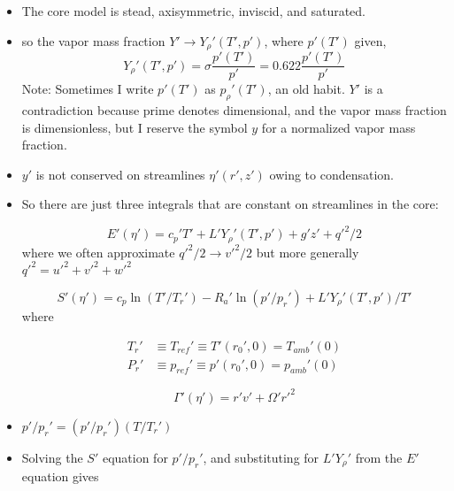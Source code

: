 \documentclass{article}
\begin{document}
\begin{itemize}
\item The core model is stead, axisymmetric, inviscid, and saturated.

\item so the vapor mass fraction $Y' \rightarrow Y_\rho'(T',p')$, where $p'(T')$ given,
\begin{equation}
	Y_\rho'(T',p') = \sigma \frac{p'(T')}{p'} = 0.622 \frac{p'(T')}{p'}
\end{equation}
Note: Sometimes I write $p'(T')$ as $p_\rho'(T')$, an old habit. $Y'$ is a contradiction because prime denotes dimensional, and the vapor mass fraction is dimensionless, but I reserve the symbol $y$ for a normalized vapor mass fraction.

\item $y'$ is not conserved on streamlines $\eta'(r',z')$ owing to condensation.

\item So there are just three integrals that are constant on streamlines in the core:

\begin{equation}
E'(\eta') = c_p' T' + L' Y_\rho'(T',p') + g'z' + q'^2/2
\end{equation}
where we often approximate $q'^2/2 \rightarrow v'^2/2$ but more generally $q'^2 = u'^2 + v'^2 + w'^2$

\begin{equation}
	S'(\eta') = c_p \ln(T' / T_r') - R_a' \ln(p'/p_r') + L'Y_\rho'(T',p')/T'
\end{equation}
where

\begin{equation}
\begin{split}
	T_r' & \equiv T_{ref}' \equiv T'(r_0', 0) = T_{amb}'(0) \\
	P_r' & \equiv p_{ref}' \equiv p'(r_0', 0) = p_{amb}'(0)
\end{split}	
\end{equation}

\begin{equation}
	\Gamma'(\eta') = r' v' + \Omega'r'^2
\end{equation}

\item $p'/p_r' = (p'/p_r')(T/T_r')$

\item Solving the $S'$ equation for $p'/p_r'$, and substituting for $L'Y_\rho'$ from the $E'$ equation gives


\end{itemize}
\end{document}
